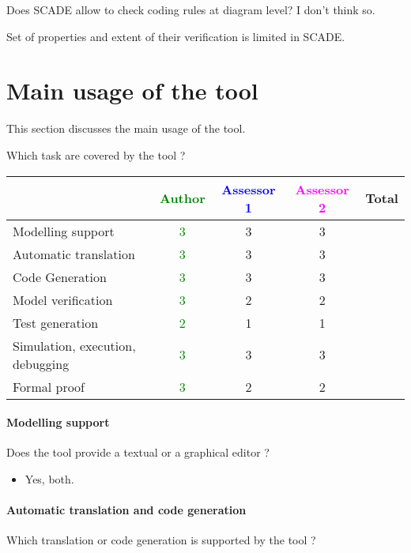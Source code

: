 \begin{assessor1}
  Does SCADE allow to check coding rules at diagram level? I don't
  think so.

  Set of properties and extent of their verification is limited in
  SCADE.
\end{assessor1}



\section{Main usage of the tool}
\label{main_usage}

This section discusses the main usage of the tool.

Which task are covered by the tool ?


\begin{tabular}{|l | c | c | c | c|}
\hline
& \textcolor{green}{Author} & \textcolor{blue}{Assessor 1} & \textcolor{magenta}{Assessor 2} & Total \\
\hline 
Modelling support & \textcolor{green}{3} & 3 &3 &  \\
\hline
Automatic translation  & \textcolor{green}{3} & 3 &3 & \\
\hline
Code Generation  & \textcolor{green}{3} & 3 &3 & \\
\hline
Model verification & \textcolor{green}{3} & 2 &2 & \\
\hline
Test generation & \textcolor{green}{2} & 1 &1 & \\
\hline
Simulation, execution, debugging & \textcolor{green}{3} & 3 &3 & \\
\hline
Formal proof & \textcolor{green}{3} & 2 &2 & \\
\hline
\end{tabular}

\paragraph{Modelling support}
Does the tool provide a  textual or a graphical editor ? 

\begin{itemize}
	\item Yes, both.
\end{itemize}


\paragraph{Automatic translation and code generation}
Which translation or code generation is supported by the tool ?

